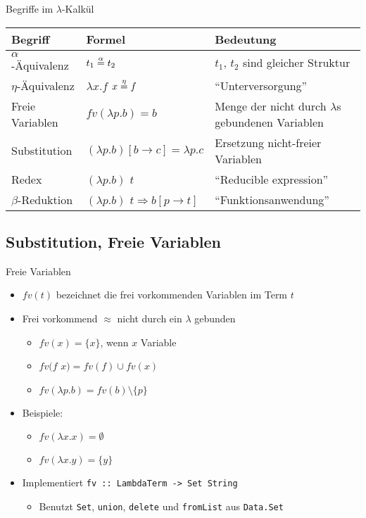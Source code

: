 \documentclass{beamer}
\begin{document}

\begin{frame}{Begriffe im $\lambda$-Kalkül}
	\fontsize{9pt}{13}\selectfont

	\begin{tabularx}{\textwidth}{ s | X | X }
		\textbf{Begriff} & \textbf{Formel} & \textbf{Bedeutung} \\
		\hline
		$\alpha$-Äquivalenz & $t_1 \stackrel{\alpha}{=} t_2$ & $t_1$, $t_2$ sind gleicher Struktur \\
		\hline
		$\eta$-Äquivalenz & $\lambda{}x.f$ $x \stackrel{\eta}{=} f$ & \enquote{Unterversorgung} \\
		\hline
		Freie Variablen & $fv(\lambda{}p.b) = { b }$ & Menge der nicht durch $\lambda$s gebundenen Variablen \\
		\hline
		Substitution & $(\lambda{}p.b)\left[b\rightarrow{}c\right]=\lambda{}p.c$ & Ersetzung nicht-freier Variablen \\
		\hline
		Redex & $(\lambda{}p.b)$ $t$ & \enquote{Reducible expression} \\
		\hline
		$\beta$-Reduktion & $(\lambda{}p.b)$ $t \Rightarrow b\left[p\rightarrow{}t\right]$ & \enquote{Funktionsanwendung} \\
	\end{tabularx}
\end{frame}

\subsection{Substitution, Freie Variablen}

\begin{frame}{Freie Variablen}
	\begin{itemize}
		\item $fv(t)$ bezeichnet die frei vorkommenden Variablen im Term $t$
		\item Frei vorkommend $\approx$ nicht durch ein $\lambda$ gebunden
		\begin{itemize}
			\item $fv(x) = \{x\}$, wenn $x$ Variable
			\item $fv(f$ $x) = fv(f) \cup fv(x)$
			\item $fv(\lambda{}p.b) = fv(b) \setminus \{p\}$
		\end{itemize}
		\item Beispiele:
		\begin{itemize}
			\item $fv(\lambda{}x.x) = \emptyset$
			\item $fv(\lambda{}x.y) = \{y\}$
		\end{itemize}
		\pause
		\item Implementiert \texttt{fv :: LambdaTerm -> Set String}
		\begin{itemize}
			\item Benutzt \texttt{Set}, \texttt{union}, \texttt{delete} und \texttt{fromList} aus \texttt{Data.Set}
		\end{itemize}
	\end{itemize}
\end{frame}
\end{document}
